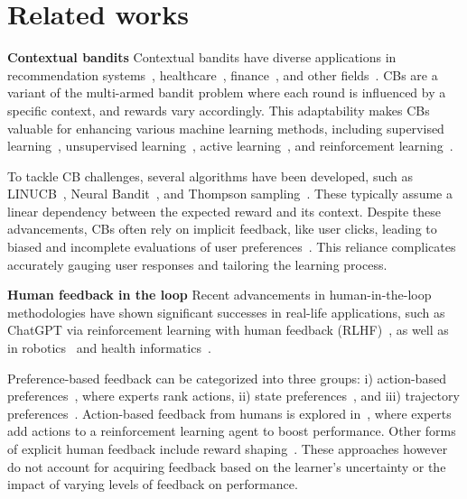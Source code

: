\section{Related works}
\textbf{Contextual bandits}
Contextual bandits have diverse applications in recommendation systems~\citep{li2010contextual, xu2020contextual}, healthcare~\citep{yu2024careforme}, finance~\citep{zhu2021online}, and other fields~\citep{bouneffouf2020survey}. CBs are a variant of the multi-armed bandit problem where each round is influenced by a specific context, and rewards vary accordingly. This adaptability makes CBs valuable for enhancing various machine learning methods, including supervised learning~\citep{sui2020bayesian}, unsupervised learning~\citep{sublime2018collaborative}, active learning~\citep{bouneffouf2014contextual}, and reinforcement learning~\citep{intayoad2020reinforcement}.

To tackle CB challenges, several algorithms have been developed, such as LINUCB~\citep{li2010contextual}, Neural Bandit~\citep{allesiardo2014neural}, and Thompson sampling~\citep{agrawal2013thompson}. These typically assume a linear dependency between the expected reward and its context. Despite these advancements, CBs often rely on implicit feedback, like user clicks, leading to biased and incomplete evaluations of user preferences~\citep{qi2018bandit}. This reliance complicates accurately gauging user responses and tailoring the learning process.



\textbf{Human feedback in the loop}
Recent advancements in human-in-the-loop methodologies have shown significant successes in real-life applications, such as ChatGPT via reinforcement learning with human feedback (RLHF)~\citep{macglashan2017interactive}, as well as in robotics~\citep{argall2009survey} and health informatics~\citep{holzinger2016interactive}. 

Preference-based feedback can be categorized into three groups: i) action-based preferences~\citep{furnkranz2012preference}, where experts rank actions, ii) state preferences~\citep{wirth2014learning}, and iii) trajectory preferences~\cite{busa2014preference,novoseller2020dueling}. Action-based feedback from humans is explored in~\citep{mandel2017add}, where experts add actions to a reinforcement learning agent to boost performance. Other forms of explicit human feedback include reward shaping~\citep{xiao2020fresh,biyik2022learning,ibarz2018reward,arakawa2018dqn}. These approaches however do not account for acquiring feedback based on the learner's uncertainty or the impact of varying levels of feedback on performance.


